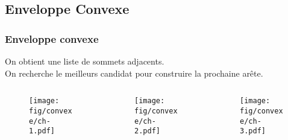 \subsection{Enveloppe Convexe}

\begin{frame}
  \frametitle{Enveloppe convexe}

  \begin{block}{}
    On obtient une liste de sommets adjacents.\\
    On recherche le meilleurs candidat pour construire la prochaine arête.
  \end{block} 

  \begin{columns}[t]
 	 \begin{column}{3cm}
			\begin{figure}[h!]
	      \centering
	      \texttt{[image: fig/convexe/ch-1.pdf]}
     	\end{figure}    
    \end{column}

    \begin{column}{3cm}
      \begin{figure}[h!]
		      \centering
		      \texttt{[image: fig/convexe/ch-2.pdf]}
     	\end{figure}    
    \end{column}
			
		\begin{column}{3cm}
      \begin{figure}[h!]
		      \centering
		      \texttt{[image: fig/convexe/ch-3.pdf]}
     	\end{figure}    
    \end{column}
        
	\end{columns}  

\end{frame}


